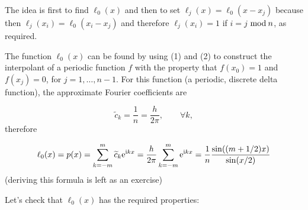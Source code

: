 \documentclass[12pt,a4paper]{article}
\begin{document}
The idea is first to find $\ell_0(x)$ and then to set $\ell_{j}(x) = \ell_0(x-x_j)$ because then  $\ell_{j}(x_i) = \ell_0(x_{i}-x_j)$ and therefore $\ell_{j}(x_{i}) = 1$ if  $i = j$ ${\rm mod } \:n$, as required.

The function $\ell_0(x)$ can be found by using (1) and (2) to construct the interpolant of a periodic function $f$ with the property that $f(x_0) = 1$ and $f(x_j) = 0$, for $j = 1, \ldots, n-1$. For this function (a periodic, discrete delta function), the approximate Fourier coefficients are

\[
\widetilde{c}_{k} = \frac{1}{n} = \frac{h}{2\pi}, \qquad \forall k,
\]
therefore

\[
\ell_0(x) = p(x) = \sum_{k=-m}^{m} \widetilde{c}_k{\rm e}^{{\rm i}kx} = \frac{h}{2\pi}\sum_{k=-m}^{m} {\rm e}^{{\rm i}kx} = \frac{1}{n}\frac{\sin((m+1/2)x)}{\sin(x/2)}
\]
(deriving this formula is left as an exercise)

Let's check that $\ell_0(x)$ has the required properties:
\end{document}
